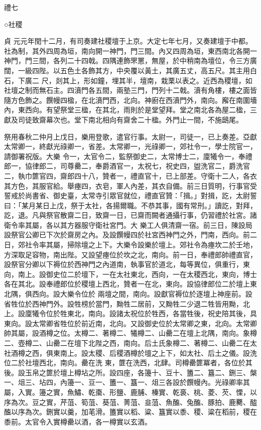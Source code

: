 
\begin{pinyinscope}

 禮七



 ○社稷



 貞
 元元年閏十二月，有司奏建社稷壇于上京。大定七年七月，又奏建壇于中都。社為制，其外四周為垣，南向開一神門，門三間。內又四周為垣，東西南北各開一神門，門三間，各列二十四戟。四隅連飾罘罳，無屋，於中稍南為壇位，令三方廣闊，一級四陛。以五色土各飾其方，中央覆以黃土，其廣五丈，高五尺。其主用白石，下廣二
 尺，剡其上，形如鐘，埋其半，壇南，栽栗以表之。近西為稷壇，如社壇之制而無石主。四濆門各五間，兩塾三門，門列十二戟。濆有角樓，樓之面皆隨方色飾之。饌幔四楹，在北濆門西，北向。神廚在西濆門外，南向。廨在南圍墻內，東西向。有望祭堂三楹，在其北，雨則於是堂望拜。堂之南北各為屋二楹，三獻及司徒致齋幕次也。堂下南北相向有齋舍二十楹。外門止一間，不施鴟尾。



 祭用春秋二仲月上戊日，樂用登歌，遣官行事。太尉一，司徒一，已上奏差。亞獻太常卿一，終獻光祿卿一，省差。太常卿一，光祿卿一，郊社令一，學士院官一，請御署祝版。大樂
 令一，太官令二，監祭御史二，太常博士二，廩犧令一，奉禮郎一，協律郎二，司尊罍二，奉爵酒官一，太祝七，祝史四，盥洗官二，爵洗官二，執巾篚官四，齋郎四十八，贊者一，禮直官十，已上部差。守衛十二人，各衣其方色，其服官給。舉瘞四，衣皂，軍人內差，其衣自備。前三日質明，行事官受誓戒於尚書省、御史臺，太常寺引眾官就位，禮直官贊：「揖。」對揖，訖，太尉誓曰：「某月某日上戊，祭于太社，各揚爾職。不恭其事，國有常刑。」讀訖，對拜，訖，退。凡與祭官散齋二日，致齋一日，已齋而闕者通攝行事，仍習禮於社宮。諸衛令率其屬，各以其方器服守衛社宮門。大
 樂工人俱清齋一宿。前三日，陳設局設祭官公卿已下次於齋房之內。及設饌幔四於社宮西神門之外，門南，西向。前二日，郊社令率其屬，掃除壇之上下。大樂令設樂於壇上。郊社令為瘞坎二於壬地，方深取足容物，南出陛。又設望瘞位於坎之北，南向。前一日，奉禮郎帥禮直官，設祭官分卿以下褥位於西神門之內道南，執事官於道北，每等異位，俱重行，東向，南上。設御史位二於壇下，一在太社東北，西向，一在太稷西北，東向，博士各在其北。設奉禮郎位於稷壇上西北，贊者一在北，東向。設協律郎位二於壇上東北隅，俱西向。設大樂令位於
 兩壇之間，南向。設獻官褥位於逐壇上神座前。設省牲位於西神門外。設牲榜於當門，黝牲二居前，又黝牲二少退二牲皆用黝，北上。設廩犧令位於牲東北，南向。設諸太祝位於牲西，各當牲後，祝史陪其後，具東向。設太常卿省牲位於前近南，北向。又設御史位於太常卿之東，北向。太常卿帥其屬，設酒樽之位。太樽二、著樽二、犧樽二、山罍二在壇上北隅，南向。象樽二、壺樽二、山罍二在壇下北陛之西，南向。后土氏象樽二、著樽二、山罍二在太社酒樽之西，俱東南上。設太稷、后稷酒樽於壇之上下，如太社、后土之儀。設洗位二於社壇西北，南向。罍在洗
 東，篚在洗西，北肆。司樽罍篚冪者，各位於其後。設玉帛之篚於壇上樽坫之所。設四座，各籩十、豆十、簠二、簋二、鉶三、槃一、俎三、坫四，內籩一、豆一、簠一、簋一、俎三各設於饌幔內。光祿卿率其屬，入實。籩之實，魚鱐、乾棗、形鹽、鹿脯、榛實、乾裛、桃、菱、芡、慄，以序為次。豆之實，芹菹、筍菹、葵菹、菁菹、韭菹、魚醢、兔醢、豚拍、鹿臡、醓醢以序為次。鉶實以羹，加芼滑。簠實以稻、粱、簋實以黍、稷、粱在稻前，稷在黍前。太官令入實樽罍以酒，各一樽實以玄酒。




\end{pinyinscope}

